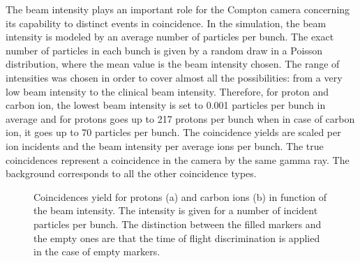 \documentclass[12pt]{iopart}
\begin{document}
The beam intensity plays an important role for the Compton camera concerning its capability to distinct events in coincidence. In the simulation, the beam intensity is modeled by an average number of particles per bunch. The exact number of particles in each bunch is given by a random draw in a Poisson distribution, where the mean value is the beam intensity chosen. The range of intensities was chosen in order to cover almost all the possibilities: from a very low beam intensity to the clinical beam intensity. Therefore, for proton and carbon ion, the lowest beam intensity is set to 0.001 particles per bunch in average and for protons goes up to 217 protons per bunch when in case of carbon ion, it goes up to 70 particles per bunch. The coincidence yields are scaled per ion incidents and the beam intensity per average ions per bunch. The true coincidences represent a coincidence in the camera by the same gamma ray. The background corresponds to all the other coincidence types.


\begin{figure} [!h]
\caption{Coincidences yield for protons (a) and carbon ions (b) in function of the beam intensity. The intensity is given for a number of incident particles per bunch.  The distinction between the filled markers and the empty ones are that the time of flight discrimination is applied in the case of empty markers.}
  \label{fig:coincidences}
\end{figure}
\end{document}
